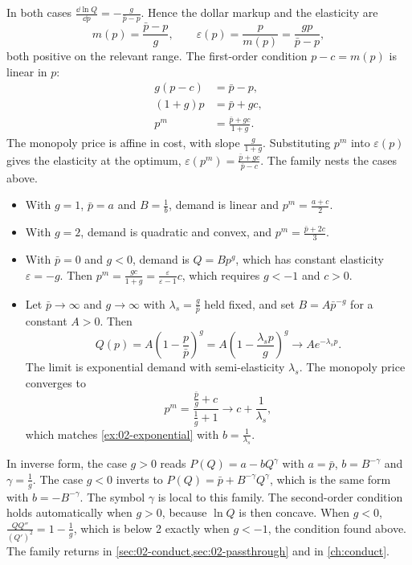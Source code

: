 \begin{example}
In both cases $\frac{\dd \ln Q}{\dd p} = -\frac{g}{\bar p - p}$. Hence the dollar markup and the elasticity are
\[
  m(p) = \frac{\bar p - p}{g}, \qquad \varepsilon(p) = \frac{p}{m(p)} = \frac{gp}{\bar p - p},
\]
both positive on the relevant range. The first-order condition $p - c = m(p)$ is linear in $p$:
\begin{align*}
  g(p - c) &= \bar p - p, \\
  (1 + g)p &= \bar p + gc, \\
  p^m &= \frac{\bar p + gc}{1 + g} .
\end{align*}
The monopoly price is affine in cost, with slope $\frac{g}{1 + g}$. Substituting $p^m$ into $\varepsilon(p)$ gives
the elasticity at the optimum, $\varepsilon(p^m) = \frac{\bar p + gc}{\bar p - c}$. The family nests the cases above.
\begin{itemize}
  \item With $g = 1$, $\bar p = a$ and $B = \frac{1}{b}$, demand is linear and $p^m = \frac{a + c}{2}$.
  \item With $g = 2$, demand is quadratic and convex, and $p^m = \frac{\bar p + 2c}{3}$.
  \item With $\bar p = 0$ and $g < 0$, demand is $Q = Bp^{g}$, which has constant elasticity $\varepsilon = -g$.
  Then $p^m = \frac{gc}{1 + g} = \frac{\varepsilon}{\varepsilon - 1}c$, which requires $g < -1$ and $c > 0$.
  \item Let $\bar p \to \infty$ and $g \to \infty$ with $\lambda_s = \frac{g}{\bar p}$ held fixed, and set
  $B = A\bar p^{-g}$ for a constant $A > 0$. Then
  \[
    Q(p) = A\left(1 - \frac{p}{\bar p}\right)^{g} = A\left(1 - \frac{\lambda_s p}{g}\right)^{g} \to A e^{-\lambda_s p} .
  \]
  The limit is exponential demand with semi-elasticity $\lambda_s$. The monopoly price converges to
  \[
    p^m = \frac{\frac{\bar p}{g} + c}{\frac{1}{g} + 1} \to c + \frac{1}{\lambda_s},
  \]
  which matches \cref{ex:02-exponential} with $b = \frac{1}{\lambda_s}$.
\end{itemize}
In inverse form, the case $g > 0$ reads $P(Q) = a - bQ^{\gamma}$ with $a = \bar p$, $b = B^{-\gamma}$ and
$\gamma = \frac{1}{g}$. The case $g < 0$ inverts to $P(Q) = \bar p + B^{-\gamma}Q^{\gamma}$, which is the same form
with $b = -B^{-\gamma}$. The symbol $\gamma$ is local to this family. The second-order condition holds
automatically when $g > 0$, because $\ln Q$ is then concave. When $g < 0$, $\frac{QQ''}{(Q')^2} = 1 - \frac{1}{g}$,
which is below 2 exactly when $g < -1$, the condition found above. The family returns in
\cref{sec:02-conduct,sec:02-passthrough} and in \cref{ch:conduct}.
\end{example}

